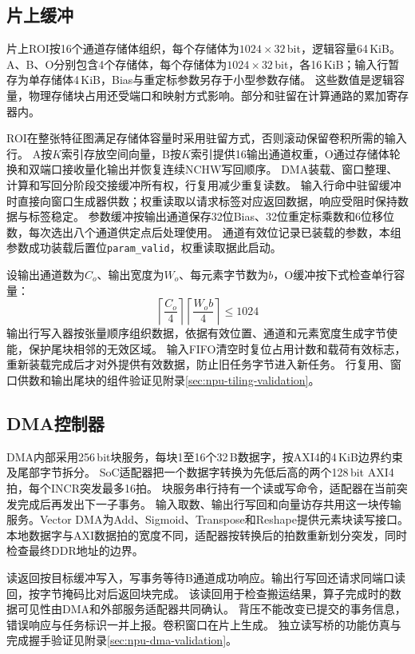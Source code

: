 \subsection{片上缓冲}

片上ROI按16个通道存储体组织，每个存储体为$1024\times32$\,bit，逻辑容量64\,KiB。
A、B、O分别包含4个存储体，每个存储体为$1024\times32$\,bit，各16\,KiB；输入行暂存为单存储体4\,KiB，Bias与重定标参数另存于小型参数存储。
这些数值是逻辑容量，物理存储块占用还受端口和映射方式影响。部分和驻留在计算通路的累加寄存器内。

ROI在整张特征图满足存储体容量时采用驻留方式，否则滚动保留卷积所需的输入行。
A按$K$索引存放空间向量，B按$K$索引提供16输出通道权重，O通过存储体轮换和双端口接收量化输出并恢复连续NCHW写回顺序。
DMA装载、窗口整理、计算和写回分阶段交接缓冲所有权，行复用减少重复读数。
输入行命中驻留缓冲时直接向窗口生成器供数；权重读取以请求标签对应返回数据，响应受阻时保持数据与标签稳定。
参数缓冲按输出通道保存32位Bias、32位重定标乘数和6位移位数，每次选出八个通道供定点后处理使用。
通道有效位记录已装载的参数，本组参数成功装载后置位\texttt{param\_valid}，权重读取据此启动。

设输出通道数为$C_o$、输出宽度为$W_o$、每元素字节数为$b$，O缓冲按下式检查单行容量：
\[
\left\lceil\frac{C_o}{4}\right\rceil
\left\lceil\frac{W_o b}{4}\right\rceil\leq1024
\]
输出行写入器按张量顺序组织数据，依据有效位置、通道和元素宽度生成字节使能，保护尾块相邻的无效区域。
输入FIFO清空时复位占用计数和载荷有效标志，重新装载完成后才对外提供有效数据，防止旧任务字节进入新任务。
行复用、窗口供数和输出尾块的组件验证见附录\ref{sec:npu-tiling-validation}。

\subsection{DMA控制器}

DMA内部采用256\,bit块服务，每块1至16个32\,B数据字，按AXI4的4\,KiB边界约束\cite{arm-axi-ihi0022e}及尾部字节拆分。
SoC适配器把一个数据字转换为先低后高的两个128\,bit AXI4拍，每个INCR突发最多16拍。
块服务串行持有一个读或写命令，适配器在当前突发完成后再发出下一子事务。
输入取数、输出行写回和向量访存共用这一块传输服务。Vector DMA为Add、Sigmoid、Transpose和Reshape提供元素块读写接口。
本地数据字与AXI数据拍的宽度不同，适配器按转换后的拍数重新划分突发，同时检查最终DDR地址的边界。

读返回按目标缓冲写入，写事务等待B通道成功响应。输出行写回还请求同端口读回，按字节掩码比对后返回块完成。
该读回用于检查搬运结果，算子完成时的数据可见性由DMA和外部服务适配器共同确认。
背压不能改变已提交的事务信息，错误响应与任务标识一并上报。卷积窗口在片上生成。
独立读写桥的功能仿真与完成握手验证见附录\ref{sec:npu-dma-validation}。

